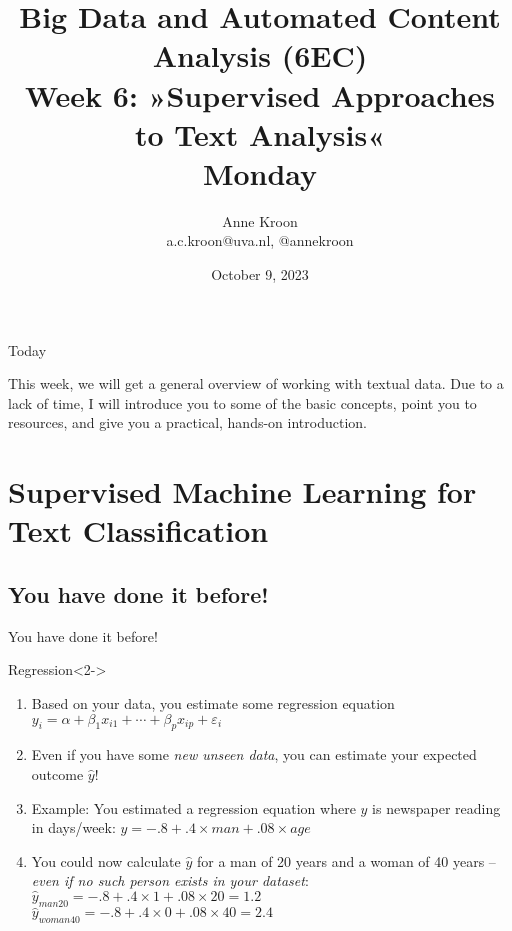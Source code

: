 \documentclass[compress]{beamer}
\begin{document}
\title[Big Data and Automated Content Analysis]{\textbf{Big Data and Automated Content Analysis (6EC)} 
\\Week 6: »Supervised Approaches to Text Analysis«
\\Monday}
\author[Anne Kroon]{Anne Kroon\\ \footnotesize{a.c.kroon@uva.nl, @annekroon \\}}
\date{October 9, 2023}


\begin{frame}{}
	\titlepage
\end{frame}

\begin{frame}{Today}
	\tableofcontents
\end{frame}



\begin{frame}[standout]
This week, we will get a general overview of working with textual data. Due to a lack of time, I will introduce you to some of the basic concepts, point you to resources, and give you a practical, hands-on introduction. 
\end{frame}


\section{Supervised Machine Learning for Text Classification}

\subsection{You have done it before!}
\begin{frame}{You have done it before!}
	\begin{block}{Regression}<2->
		\begin{enumerate}
			\item<3-> Based on your data, you estimate some regression equation 	$y_i = \alpha + \beta_1 x_{i1} + \cdots + \beta_p x_{ip} + \varepsilon_i$
			\item<4-> Even if you have some \emph{new unseen data}, you can estimate your expected outcome $\hat{y}$!
			\item<5-> Example: You estimated a regression equation where $y$ is newspaper reading in days/week: $y = -.8 + .4 \times man + .08 \times age$
			\item<6-> You could now calculate $\hat{y}$ for a man of 20 years and a woman of 40 years -- \emph{even if no such person exists in your dataset}: \\
			$\hat{y}_{man20} = -.8 + .4 \times 1 + .08 \times 20 = 1.2$ \\
			$\hat{y}_{woman40} = -.8 + .4 \times 0 + .08 \times 40 = 2.4$
		\end{enumerate}
	\end{block}	
	
\end{frame}
\end{document}

